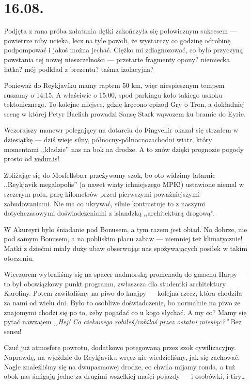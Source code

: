 \chapter*{16.08.}

Podjęta z rana próba załatania dętki zakończyła się połowicznym sukcesem --- powietrze niby ucieka, lecz na tyle powoli, że wystarczy co godzinę odrobinę podpompować i jakoś można jechać. Ciężko mi zdiagnozować, co było przyczyną powstania tej nowej nieszczelności --- przetarte fragmenty opony? niemiecka łatka? mój podkład z brezentu? taśma izolacyjna?

Ponieważ do Reykjavíku mamy raptem 50 km, więc niespiesznym tempem ruszamy o 14:15. A właściwie o 15:00, spod parkingu koło takiego uskoku tektonicznego. To kolejne miejsce, gdzie kręcono epizod Gry o Tron, a dokładniej scenę w której Petyr Baelish prowadzi Sansę Stark wąwozem ku bramie do Eyrie.

Wczorajszy manewr polegający na dotarciu do Þingvellir okazał się strzałem w dziesiątkę --- dziś wieje silny, północny-północnozachodni wiatr, który momentami ,,kładzie'' nas na bok na drodze. A to znów dzięki prognozie pogody prosto od \url{vedur.is}!

Zbliżając się do Mosfellsbær przeżywamy szok, bo oto widzimy latarnie ,,Reykjavik megalopolis'' (a nawet wiaty ichniejszego MPK!) ustawione niemal w szczerym polu, parę kilometrów przed pierwszymi poważniejszymi zabudowaniami. Nie ma co ukrywać, silnie kontrastuje to z naszymi dotychczasowymi doświadczeniami z islandzką ,,architekturą drogową''.


W Akureyri było śniadanie pod Bonusem, a tym razem jest obiad. No dobrze, nie pod samym Bonusem, a na pobliskim placu zabaw --- niemniej też klimatycznie! Matki z dziećmi miały duży ubaw obserwując nas spożywających posiłek w takim otoczeniu.

Wieczorem wybraliśmy się na spacer nadmorską promenadą do gmachu Harpy --- to był obowiązkowy punkt programu, zwłaszcza dla studentki architektury Karoliny. Potem zawitaliśmy na piwo do knajpy --- kolejna rzecz, która chodziła za nami od wielu dni. Było to osobliwe doświadczenie, bo normalnie na piwo ze znajomymi chodzi się po to, żeby pogadać co u kogo słychać. A my co? Mamy się pytać nawzajem \emph{,,Hej! Co ciekawego robiłeś/robiłaś przez ostatni miesiąc?''} Bez sensu!

Czuć już atmosferę powrotu, dodatkowo potęgowaną przez szok cywilizacyjny. Naprawdę, na wjeździe  do Reykjaviku wręcz nie wiedzieliśmy, jak się zachować. Nagle znaleźliśmy się na dwupasmowej drodze, co chwila mijamy ronda, a tuż obok nas śmigają jedne za drugimi wszelkiej maści pojazdy --- i osobówki, i tiry…

